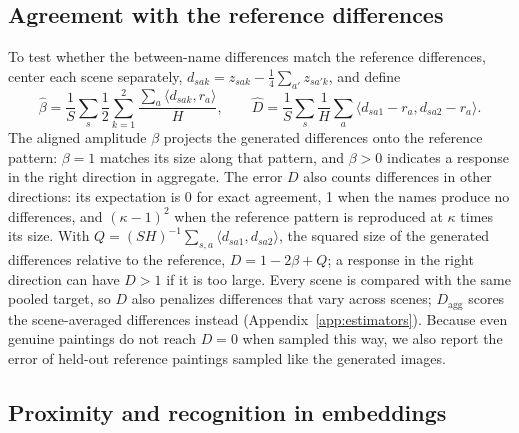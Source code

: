 \documentclass[10pt]{article}
\newcommand{\ip}[2]{\langle #1,#2\rangle}
\begin{document}
\subsection{Agreement with the reference differences}

To test whether the between-name differences match the reference differences, center each scene
separately, $d_{sak}=z_{sak}-\frac14\sum_{a'}z_{sa'k}$, and define
\begin{equation}
\widehat\beta=\frac1S\sum_s\frac{1}{2}\sum_{k=1}^2\frac{\sum_a\ip{d_{sak}}{r_a}}{H},\qquad
\widehat D=\frac1S\sum_s\frac1H\sum_a\ip{d_{sa1}-r_a}{d_{sa2}-r_a}.
\label{eq:beta-d}
\end{equation}
The aligned amplitude $\beta$ projects the generated differences onto the reference pattern:
$\beta=1$ matches its size along that pattern, and $\beta>0$ indicates a response in the right
direction in aggregate. The error $D$ also counts differences in other directions: its
expectation is 0 for exact agreement, 1 when the names produce no differences, and
$(\kappa-1)^2$ when the reference pattern is reproduced at $\kappa$ times its size. With
$Q=(SH)^{-1}\sum_{s,a}\ip{d_{sa1}}{d_{sa2}}$, the squared size of the generated differences
relative to the reference, $D=1-2\beta+Q$; a response in the right direction can have $D>1$ if it
is too large. Every scene is compared with the same pooled target, so $D$ also penalizes
differences that vary across scenes; $D_{\mathrm{agg}}$ scores the scene-averaged differences
instead (Appendix~\ref{app:estimators}). Because even genuine paintings do not reach $D=0$ when
sampled this way, we also report the error of held-out reference paintings sampled like the
generated images.

\subsection{Proximity and recognition in embeddings}
\end{document}
